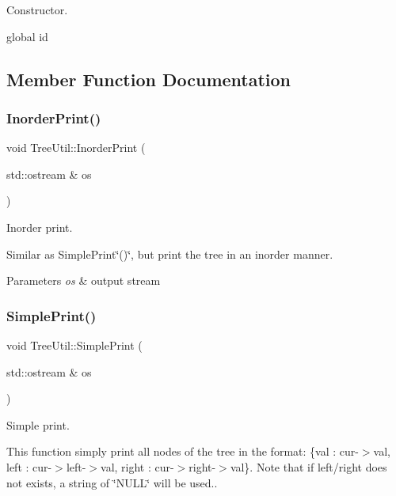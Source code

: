 Constructor. 

global id 

\subsection{Member Function Documentation}
\mbox{\label{classTreeUtil_ab7617a40a2b508602c5094667c318a4f}} 
\subsubsection{\texorpdfstring{Inorder\+Print()}{InorderPrint()}}
{\footnotesize\ttfamily void Tree\+Util\+::\+Inorder\+Print (\begin{DoxyParamCaption}\item[{std\+::ostream \&}]{os }\end{DoxyParamCaption})\hspace{0.3cm}{\ttfamily [inline]}}



Inorder print. 

Similar as Simple\+Print\char`\"{}()\char`\"{}, but print the tree in an inorder manner.


\begin{DoxyParams}{Parameters}
{\em os} & output stream \\
\hline
\end{DoxyParams}
\mbox{\label{classTreeUtil_af6d09d8d92320373731994e39549dd9e}} 
\subsubsection{\texorpdfstring{Simple\+Print()}{SimplePrint()}}
{\footnotesize\ttfamily void Tree\+Util\+::\+Simple\+Print (\begin{DoxyParamCaption}\item[{std\+::ostream \&}]{os }\end{DoxyParamCaption})\hspace{0.3cm}{\ttfamily [inline]}}



Simple print. 

This function simply print all nodes of the tree in the format\+: \{val \+: cur-\/$>$val, left \+: cur-\/$>$left-\/$>$val, right \+: cur-\/$>$right-\/$>$val\}. Note that if left/right does not exists, a string of \char`\"{}\+N\+U\+L\+L\char`\"{} will be used..


